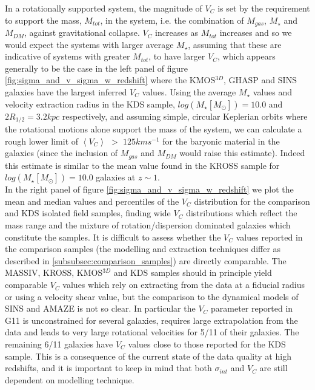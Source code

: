 \documentclass[fleqn,usenatbib]{mn2e}
\begin{document}
In a rotationally supported system, the magnitude of $V_{C}$ is set by the requirement to support the mass, $M_{tot}$, in the system, i.e. the combination of $M_{gas}$, $M_{\star}$ and $M_{DM}$, against gravitational collapse.
$V_{C}$ increases as $M_{tot}$ increases and so we would expect the systems with larger average $M_{\star}$, assuming that these are indicative of systems with greater $M_{tot}$, to have larger $V_{C}$, which appears generally to be the case in the left panel of figure \ref{fig:sigma_and_v_sigma_w_redshift} where the KMOS$^{3D}$, GHASP and SINS galaxies have the largest inferred $V_{C}$ values.
Using the average $M_{\star}$ values and velocity extraction radius in the KDS sample, $log(M_{\star}[M_{\odot}])=10.0$ and $2R_{1/2} = 3.2kpc$ respectively, and assuming simple, circular Keplerian orbits where the rotational motions alone support the mass of the system, we can calculate a rough lower limit of $\left<V_{C}\right>$ $>$ $125kms^{-1}$ for the baryonic material in the galaxies (since the inclusion of $M_{gas}$ and $M_{DM}$ would raise this estimate).
Indeed this estimate is similar to the mean value found in the KROSS sample for $log(M_{\star}[M_{\odot}])=10.0$ galaxies at $z\sim1$. \\


In the right panel of figure \ref{fig:sigma_and_v_sigma_w_redshift} we plot the mean and median values and percentiles of the $V_{C}$ distribution for the comparison and KDS isolated field samples, finding wide $V_{C}$ distributions which reflect the mass range and the mixture of rotation/dispersion dominated galaxies which constitute the samples.
It is difficult to assess whether the $V_{C}$ values reported in the comparison samples (the modelling and extraction techniques differ as described in \cref{subsubsec:comparison_samples}) are directly comparable.
The MASSIV, KROSS, KMOS$^{3D}$ and KDS samples should in principle yield comparable $V_{C}$ values which rely on extracting from the data at a fiducial radius or using a velocity shear value, but the comparison to the dynamical models of SINS and AMAZE is not so clear.
In particular the $V_{C}$ parameter reported in G11 is unconstrained for several galaxies, requires large extrapolation from the data and leads to very large rotational velocities for 5/11 of their galaxies.
The remaining 6/11 galaxies have $V_{C}$ values close to those reported for the KDS sample.
This is a consequence of the current state of the data quality at high redshifts, and it is important to keep in mind that both $\sigma_{int}$ and $V_{C}$ are still dependent on modelling technique. \\
\end{document}
